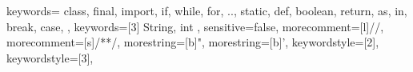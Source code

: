 

{
	keywords={
		class,
		final,
		import,
		if,
		while,
		for,
		..,
		static,
		def,
		boolean,
		return,
		as,
		in,
		break,
		case,
	},
	keywords=[3]{
		String,
		int
	},
	sensitive=false, %
	morecomment=[l]{//}, %
	morecomment=[s]{/*}{*/}, %
	morestring=[b]", %
	morestring=[b]', %
	keywordstyle=[2]\color{codeOrange},
	keywordstyle=[3]\color{codePurple},
}